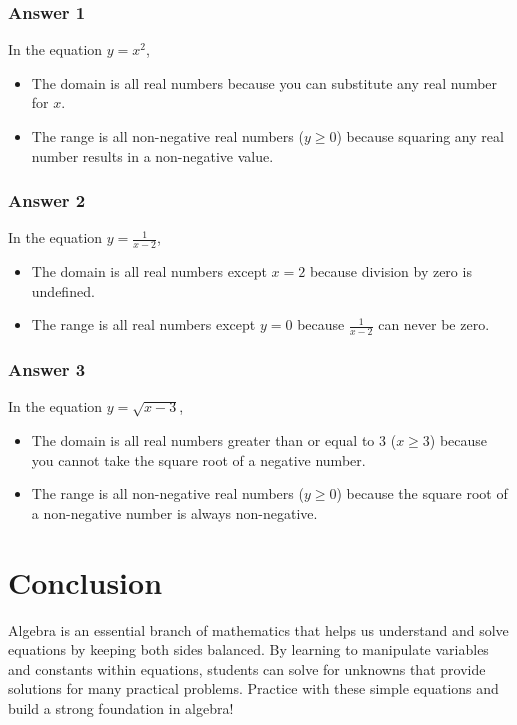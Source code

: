 \documentclass[12pt]{article}
\begin{document}
\subsubsection*{Answer 1}

In the equation \( y = x^2 \),

\begin{itemize}
    \item The domain is all real numbers because you can substitute any real number for \( x \).
    \item The range is all non-negative real numbers (\( y \geq 0 \)) because squaring any real number results in a non-negative value.
\end{itemize}

\subsubsection*{Answer 2}

In the equation \( y = \frac{1}{x - 2} \),

\begin{itemize}
    \item The domain is all real numbers except \( x = 2 \) because division by zero is undefined.
    \item The range is all real numbers except \( y = 0 \) because \( \frac{1}{x - 2} \) can never be zero.
\end{itemize}

\subsubsection*{Answer 3}

In the equation \( y = \sqrt{x - 3} \),

\begin{itemize}
    \item The domain is all real numbers greater than or equal to 3 (\( x \geq 3 \)) because you cannot take the square root of a negative number.
    \item The range is all non-negative real numbers (\( y \geq 0 \)) because the square root of a non-negative number is always non-negative.
\end{itemize}

\section*{Conclusion}

Algebra is an essential branch of mathematics that helps us understand and solve equations by keeping both sides balanced. By learning to manipulate variables and constants within equations, students can solve for unknowns that provide solutions for many practical problems. Practice with these simple equations and build a strong foundation in algebra!
\end{document}
